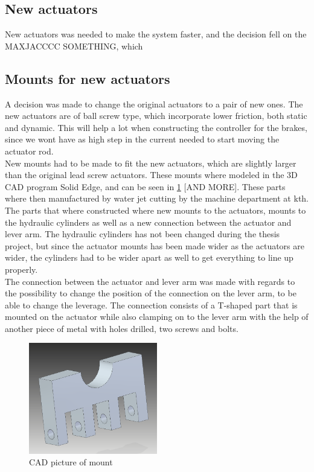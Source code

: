 \documentclass[a4paper,11pt]{kth-mag}
\begin{document}
\subsection{New actuators}
New actuators was needed to make the system faster, and the decision fell on the MAXJACCCC SOMETHING, which 

\subsection{Mounts for new actuators}

A decision was made to change the original actuators to a pair of new ones. The new actuators are of ball screw type, which incorporate lower friction, both static and dynamic. This will help a lot when constructing the controller for the brakes, since we wont have as high step in the current needed to start moving the actuator rod. \\

New mounts had to be made to fit the new actuators, which are slightly larger than the original lead screw actuators. These mounts where modeled in the 3D CAD program Solid Edge, and can be seen in \ref{fig:CAD_Actuator_mount} [AND MORE]. These parts where then manufactured by water jet cutting by the machine department at \gls{kth}. The parts that where constructed where new mounts to the actuators, mounts to the hydraulic cylinders as well as a new connection between the actuator and lever arm. The hydraulic cylinders has not been changed during the thesis project, but since the actuator mounts has been made wider as the actuators are wider, the cylinders had to be wider apart as well to get everything to line up properly. \\

The connection between the actuator and lever arm was made with regards to the possibility to change the position of the connection on the lever arm, to be able to change the leverage. The connection consists of a T-shaped part that is mounted on the actuator while also clamping on to the lever arm with the help of another piece of metal with holes drilled, two screws and bolts. \\

\begin{figure}[h]
\centering
\includegraphics[width=0.5\textwidth]{Actuator_mount}
\caption{CAD picture of mount}
\label{fig:CAD_Actuator_mount}
\end{figure}
\end{document}

